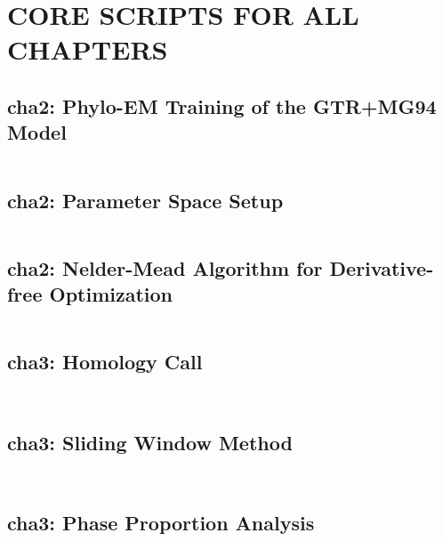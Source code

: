 \chapter{\normalfont CORE SCRIPTS FOR ALL CHAPTERS}
\label{ch:core_scripts}
\newpage


\section*{\normalfont cha2: Phylo-EM Training of the GTR+MG94 Model}
\inputminted[breaklines, breakanywhere, tabsize=2]{r}{scripts/dumbEm_simu_100.R}

\section*{\normalfont cha2: Parameter Space Setup}
\inputminted[breaklines, breakanywhere, tabsize=2]{r}{scripts/haha_para_space.R}

\section*{\normalfont cha2: Nelder-Mead Algorithm for Derivative-free Optimization}
\inputminted[breaklines, breakanywhere, tabsize=2]{r}{scripts/nmkb_100_1.R} 


\section*{\normalfont cha3: Homology Call}
\inputminted[breaklines, breakanywhere, tabsize=2]{r}{scripts/geneId_get3.R}
\newpage
\inputminted[breaklines, breakanywhere, tabsize=2]{r}{scripts/cds_get.R}

\section*{\normalfont cha3: Sliding Window Method}
\inputminted[breaklines, breakanywhere, tabsize=2]{r}{scripts/update_gap.R}
\newpage
\inputminted[breaklines, breakanywhere, tabsize=2]{r}{scripts/sw_gap.R}

\section*{\normalfont cha3: Phase Proportion Analysis}
\inputminted[breaklines, breakanywhere, tabsize=2]{r}{scripts/indel_phase.R}
\newpage
\inputminted[breaklines, breakanywhere, tabsize=2]{r}{scripts/indel_dis_plot.R}
\newpage
\inputminted[breaklines, breakanywhere, tabsize=2]{r}{scripts/dnds_pair.R}



